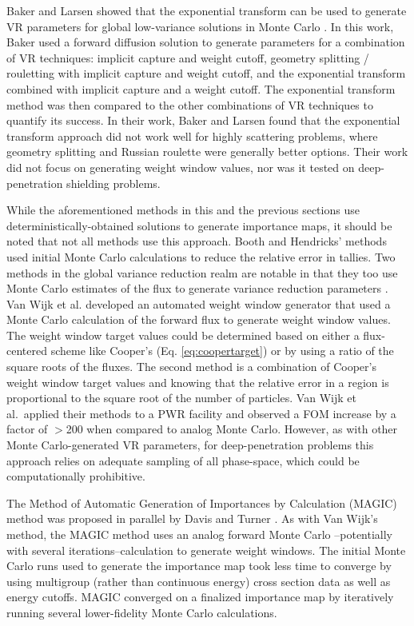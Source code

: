 Baker and Larsen showed that the exponential transform can be used to generate
VR parameters for global low-variance solutions in Monte Carlo
\cite{baker_localexponential_1993}. In this work, Baker used a forward diffusion
solution to generate parameters for a combination of VR techniques: implicit
capture and weight cutoff, geometry splitting / rouletting with implicit
capture and weight cutoff, and the exponential transform combined with
implicit capture and a weight cutoff. The exponential transform method was then
compared to the other combinations of VR techniques to quantify its success.
In their work, Baker and Larsen found that
the exponential transform approach did not work well for highly
scattering problems, where geometry
splitting and Russian roulette were generally better options. Their work did not
focus on generating weight window values, nor was it tested on deep-penetration
shielding problems.

While the aforementioned methods in this and the previous sections use
deterministically-obtained solutions to generate importance maps, it should be
noted that not all methods use this approach. Booth and Hendricks' methods used
initial Monte Carlo calculations to reduce the relative error in tallies. Two
methods in the global variance reduction realm are notable in that they too use
Monte Carlo estimates of the flux to generate variance reduction parameters
\cite{van_wijk_easy_2011, davis_comparison_2011}.
Van Wijk et al. \cite{van_wijk_easy_2011} developed an automated weight
window generator that used a Monte
Carlo calculation of the forward flux to generate weight window values. The
weight window target values could be determined based on either a flux-centered
scheme like Cooper's (Eq. \eqref{eq:coopertarget})
or by using a ratio of the square roots of the fluxes. The
second method is a combination of Cooper's weight window target values and
knowing that the relative error in a region
is proportional to the square root of the number
of particles.
Van Wijk et al.\ applied their methods to a PWR facility and observed a FOM
increase by a factor of $>$200 when compared to analog Monte Carlo. However, as
with other Monte Carlo-generated VR parameters, for deep-penetration problems
this approach relies on adequate sampling of all phase-space, which could be
computationally prohibitive.

The Method of Automatic Generation of Importances by Calculation (MAGIC) method
was proposed in parallel by Davis and Turner \cite{davis_comparison_2011}.
As with Van Wijk's method, the MAGIC method uses an analog forward Monte Carlo
--potentially with several iterations--calculation to generate weight windows.
The initial
Monte Carlo runs used to generate the importance map took less time to converge
by
using multigroup (rather than continuous energy) cross section data as well
as energy cutoffs. MAGIC
converged on a finalized importance map by iteratively running several
lower-fidelity
Monte Carlo calculations.

